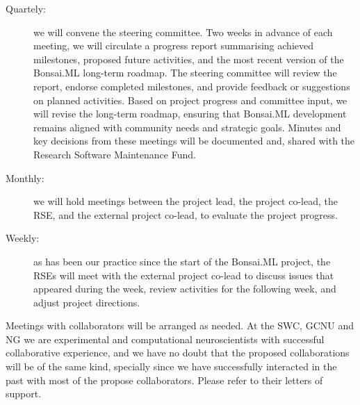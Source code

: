 \begin{description}

    \item[Quartely:] we will convene the steering committee. Two weeks in
        advance of each meeting, we will circulate a progress report
        summarising achieved milestones, proposed future activities, and the
        most recent version of the Bonsai.ML long-term roadmap.
        The steering committee will review the report, endorse completed
        milestones, and provide feedback or suggestions on planned activities.
        Based on project progress and committee input, we will revise the
        long-term roadmap, ensuring that Bonsai.ML development remains aligned
        with community needs and strategic goals.
        Minutes and key decisions from these meetings will be documented and,
        shared with the Research Software Maintenance Fund.

    \item[Monthly:] we will hold meetings between the project lead, the
        project co-lead, the RSE, and the external project co-lead, to evaluate
        the project progress.

    \item[Weekly:] as has been our practice since the start of the Bonsai.ML
        project, the RSEs will meet with the external project co-lead to
        discuss issues that appeared during the week, review activities for the
        following week, and adjust project directions.

\end{description}

Meetings with collaborators will be arranged as needed.
%
At the SWC, GCNU and NG we are experimental and computational neuroscientists
with successful collaborative experience, and we have no doubt that the
proposed collaborations will be of the same kind,
%
specially since we have successfully interacted in the past with most of the
propose collaborators.
%
Please refer to their letters of support.
